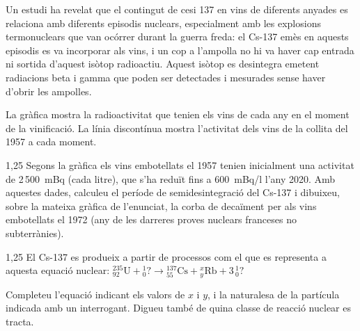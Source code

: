 Un estudi ha revelat que el contingut de cesi 137 en vins de diferents anyades es relaciona amb diferents episodis nuclears, especialment amb les explosions termonuclears que van ocórrer durant la guerra freda: el Cs-137 emès en aquests episodis es va incorporar als vins, i un cop a l'ampolla no hi va haver cap entrada ni sortida d'aquest isòtop radioactiu. Aquest isòtop es desintegra emetent radiacions beta i gamma que poden ser detectades i mesurades sense haver d'obrir les ampolles.

La gràfica mostra la radioactivitat que tenien els vins de cada any en el moment de la vinificació. La línia discontínua mostra l'activitat dels vins de la collita del 1957 a cada moment.


\begin{apartat}{1,25}
Segons la gràfica els vins embotellats el 1957 tenien inicialment una activitat de 2\,500~mBq (cada litre), que s'ha reduït fins a 600~mBq/l l'any 2020. Amb aquestes dades, calculeu el període de semidesintegració del Cs-137 i dibuixeu, sobre la mateixa gràfica de l'enunciat, la corba de decaïment per als vins embotellats el 1972 (any de les darreres proves nuclears franceses no subterrànies).
\end{apartat}

\begin{apartat}{1,25}
El Cs-137 es produeix a partir de processos com el que es representa a aquesta equació nuclear: ${}^{235}_{92}\mathrm{U} + {}^{1}_{0}? \rightarrow {}^{137}_{55}\mathrm{Cs} + {}^{x}_{y}\mathrm{Rb} + 3\,{}^{1}_{0}?$

Completeu l'equació indicant els valors de $x$ i $y$, i la naturalesa de la partícula indicada amb un interrogant. Digueu també de quina classe de reacció nuclear es tracta.
\end{apartat}


